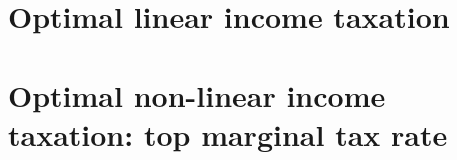 























%








\maketitle

\thispagestyle{empty}


\pagestyle{scrheadings}

\small {
\tableofcontents
}
\clearpage
\normalsize

\section{Optimal linear income taxation}


\section{Optimal non-linear income taxation: top marginal tax rate}


% 


